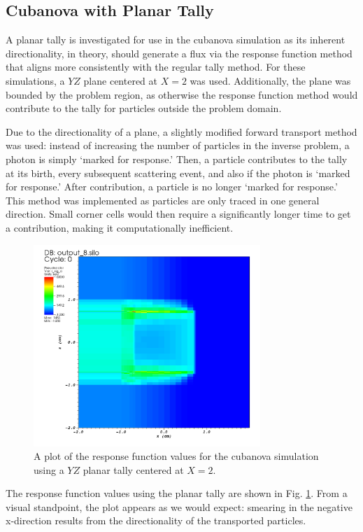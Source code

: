 \subsection{Cubanova with Planar Tally} \label{Sec: plane_tally}		
A planar tally is investigated for use in the cubanova simulation as its inherent directionality, in theory, should generate a flux via the response function method that aligns more consistently with the regular tally method. For these simulations, a $YZ$ plane centered at $X = 2$ was used. Additionally, the plane was bounded by the problem region, as otherwise the response function method would contribute to the tally for particles outside the problem domain. 

Due to the directionality of a plane, a slightly modified forward transport method was used: instead of increasing the number of particles in the inverse problem, a photon is simply `marked for response.' Then, a particle contributes to the tally at its birth, every subsequent scattering event, and also if the photon is `marked for response.' After contribution, a particle is no longer `marked for response.' This method was implemented as particles are only traced in one general direction. Small corner cells would then require a significantly longer time to get a contribution, making it computationally inefficient.

\begin{figure} [h!]
	\centering
	\includegraphics[height=3in]{VarReduction/plots/plane_r_sig_a.png}
	\caption{A plot of the response function values for the cubanova simulation using a $YZ$ planar tally centered at $X=2$. }
	\label{fig:plane_r_sig_a}
\end{figure}

The response function values using the planar tally are shown in Fig. \ref{fig:plane_r_sig_a}. From a visual standpoint, the plot appears as we would expect: smearing in the negative x-direction results from the directionality of the transported particles.

